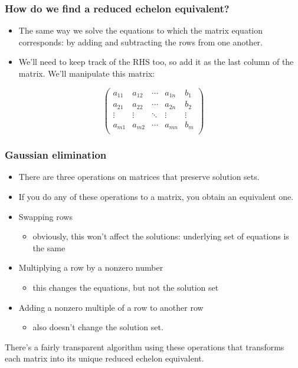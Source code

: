 \documentclass[11pt,ignorenonframetext,]{beamer}
\begin{document}
\begin{frame}\frametitle{How do we find a reduced echelon equivalent?}

\begin{itemize}
\item
  The same way we solve the equations to which the matrix equation
  corresponds: by adding and subtracting the rows from one another.
\item
  We'll need to keep track of the RHS too, so add it as the last column
  of the matrix. We'll manipulate this matrix:
\end{itemize}

\begin{equation*}
    \begin{pmatrix}
        a_{11} & a_{12} & \cdots & a_{1n} & b_1 \\
        a_{21} & a_{22} & \cdots & a_{2n} & b_2 \\
        \vdots & \vdots & \ddots & \vdots & \vdots \\
        a_{m1} & a_{m2} & \cdots & a_{mn} & b_m \\
    \end{pmatrix}
\end{equation*}

\end{frame}

\begin{frame}\frametitle{Gaussian elimination}

\begin{itemize}
\item
  There are three operations on matrices that preserve solution sets.
\item
  If you do any of these operations to a matrix, you obtain an
  equivalent one.
\item
  Swapping rows

  \begin{itemize}
  \itemsep1pt\parskip0pt
  \item
    obviously, this won't affect the solutions: underlying set of
    equations is the same
  \end{itemize}
\item
  Multiplying a row by a nonzero number

  \begin{itemize}
  \itemsep1pt\parskip0pt
  \item
    this changes the equations, but not the solution set
  \end{itemize}
\item
  Adding a nonzero multiple of a row to another row

  \begin{itemize}
  \itemsep1pt\parskip0pt
  \item
    also doesn't change the solution set.
  \end{itemize}
\end{itemize}

There's a fairly transparent algorithm using these operations that
transforms each matrix into its unique reduced echelon equivalent.

\end{frame}
\end{document}
